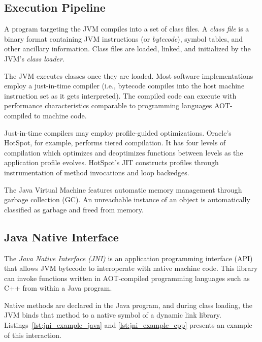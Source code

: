 
\subsection{Execution Pipeline}

A program targeting the JVM compiles into a set of class files. A \textit{class file} is a binary format containing JVM instructions (or \emph{bytecode}), symbol tables, and other ancillary information. Class files are loaded, linked, and initialized by the JVM's \emph{class loader}.

The JVM executes classes once they are loaded. Most software implementations employ a just-in-time compiler (i.e., bytecode compiles into the host machine instruction set as it gets interpreted). The compiled code can execute with performance characteristics comparable to programming languages AOT-compiled to machine code.

Just-in-time compilers may employ profile-guided optimizations. Oracle's HotSpot, for example, performs tiered compilation. It has four levels of compilation which optimizes and deoptimizes functions between levels as the application profile evolves. HotSpot's JIT constructs profiles through instrumentation of method invocations and loop backedges.

The Java Virtual Machine features automatic memory management through garbage collection (GC). An unreachable instance of an object is automatically classified as garbage and freed from memory.


\subsection{Java Native Interface}

The \emph{Java Native Interface (JNI)} is an application programming interface (API) that allows JVM bytecode to interoperate with native machine code. This library can invoke functions written in AOT-compiled programming languages such as C++ from within a Java program.

Native methods are declared in the Java program, and during class loading, the JVM binds that method to a native symbol of a dynamic link library. Listings~\ref{lst:jni_example_java} and \ref{lst:jni_example_cpp} presents an example of this interaction.

